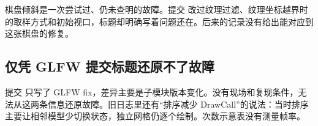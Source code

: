 棋盘倾斜是一次尝试过、仍未查明的故障。提交  改过纹理过滤、纹理坐标越界时的取样方式和初始视口，标题却明确写着问题还在。后来的记录没有给出能对应到这张棋盘的修复。

\subsection{仅凭 GLFW 提交标题还原不了故障}
提交  只写了 GLFW fix，差异主要是子模块版本变化。没有现场和复现条件，无法从这两条信息还原故障。旧日志里还有“排序减少 DrawCall”的说法：当时排序主要让相邻模型少切换状态，独立网格仍逐个绘制。次数示意表没有测量帧率。
